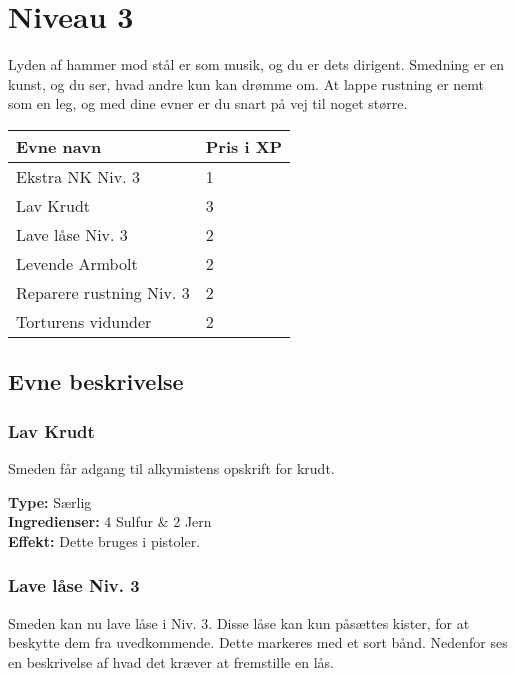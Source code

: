 \chapter{Niveau 3}
Lyden af hammer mod stål er som musik, og du er dets dirigent. Smedning er en kunst, og du ser, hvad andre kun kan drømme om. At lappe rustning er nemt som en leg, og med dine evner er du snart på vej til noget større.

\begin{table}[H]
    \centering
    \begin{tabular}{|p{}|p{}|}
    \rowcolor{cerulean!80}\hline
        Evne navn & Pris i XP \\\hline
        Ekstra NK Niv. 3 & 1 \\\hline
        Lav Krudt & 3 \\\hline
        Lave låse Niv. 3 & 2 \\\hline
        Levende Armbolt & 2 \\\hline
        Reparere rustning Niv. 3 & 2\\\hline
        Torturens vidunder & 2 \\\hline
    \end{tabular}
\end{table}
\section{Evne beskrivelse}



\subsection{Lav Krudt}
Smeden får adgang til alkymistens opskrift for krudt.
\begin{særlig*}[Krudt]
\textbf{Type:} Særlig\\
\textbf{Ingredienser:} 4 Sulfur \& 2 Jern\\
\textbf{Effekt:} Dette bruges i pistoler.\\
\end{særlig*}

\subsection{Lave låse Niv. 3}
Smeden kan nu lave låse i Niv. 3. Disse låse kan kun påsættes kister, for at beskytte dem fra uvedkommende. Dette markeres med et sort bånd. Nedenfor ses en beskrivelse af hvad det kræver at fremstille en lås.\\

